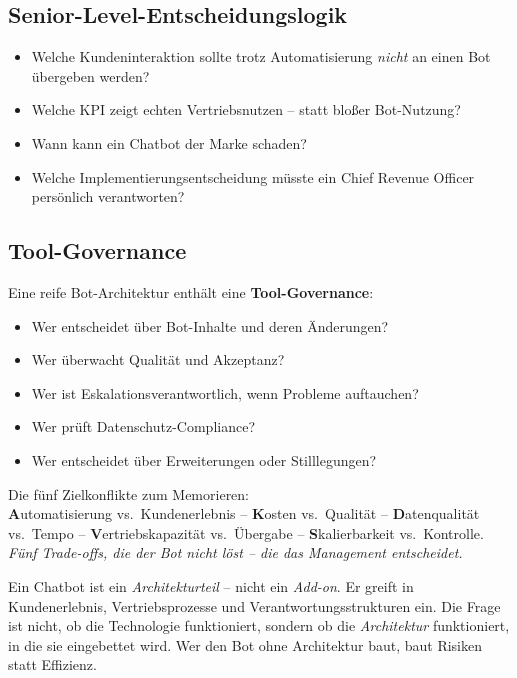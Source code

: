 \documentclass[11pt,a4paper,oneside]{article}
\newcommand{\caveatfontfallback}{\itshape}
\newcommand\caveatfont{\caveatfontfallback}%
\newcommand{\akzent}[1]{{\caveatfont\color{lpAmber}#1}}
\newcommand{\fachbegriff}[1]{\textbf{#1}}
\begin{document}
\subsection{Senior-Level-Entscheidungslogik}

\begin{itemize}
  \item Welche Kundeninteraktion sollte trotz Automatisierung \emph{nicht} an einen Bot übergeben werden?
  \item Welche KPI zeigt echten Vertriebsnutzen -- statt bloßer Bot-Nutzung?
  \item Wann kann ein Chatbot der Marke schaden?
  \item Welche Implementierungsentscheidung müsste ein Chief Revenue Officer persönlich verantworten?
\end{itemize}

\subsection{Tool-Governance}

Eine reife Bot-Architektur enthält eine \fachbegriff{Tool-Governance}:

\begin{itemize}
  \item Wer entscheidet über Bot-Inhalte und deren Änderungen?
  \item Wer überwacht Qualität und Akzeptanz?
  \item Wer ist Eskalationsverantwortlich, wenn Probleme auftauchen?
  \item Wer prüft Datenschutz-Compliance?
  \item Wer entscheidet über Erweiterungen oder Stilllegungen?
\end{itemize}

\begin{eselsbox}[Eselsbrücke: \akzent{A-K-D-V-S}]
Die fünf Zielkonflikte zum Memorieren:\\[2pt]
\textbf{A}utomatisierung vs.\ Kundenerlebnis -- \textbf{K}osten vs.\ Qualität -- \textbf{D}atenqualität vs.\ Tempo -- \textbf{V}ertriebskapazität vs.\ Übergabe -- \textbf{S}kalierbarkeit vs.\ Kontrolle.\\[2pt]
\emph{Fünf Trade-offs, die der Bot nicht löst -- die das Management entscheidet.}
\end{eselsbox}

\begin{merkbox}
Ein Chatbot ist ein \emph{Architekturteil} -- nicht ein \emph{Add-on}. Er greift in Kundenerlebnis, Vertriebsprozesse und Verantwortungsstrukturen ein. Die Frage ist nicht, ob die Technologie funktioniert, sondern ob die \emph{Architektur} funktioniert, in die sie eingebettet wird. Wer den Bot ohne Architektur baut, baut Risiken statt Effizienz.
\end{merkbox}
\end{document}
